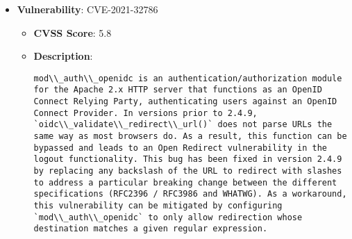 \documentclass{article}
\begin{document}
\begin{itemize}
        \item \textbf{Vulnerability}: CVE-2021-32786
        \begin{itemize}
            \item \textbf{CVSS Score}:  5.8 
            \item \textbf{Description}:
            \parbox[t]{0.9\linewidth}{
                \verb|mod\\_auth\\_openidc is an authentication/authorization module for the Apache 2.x HTTP server that functions as an OpenID Connect Relying Party, authenticating users against an OpenID Connect Provider. In versions prior to 2.4.9, `oidc\\_validate\\_redirect\\_url()` does not parse URLs the same way as most browsers do. As a result, this function can be bypassed and leads to an Open Redirect vulnerability in the logout functionality. This bug has been fixed in version 2.4.9 by replacing any backslash of the URL to redirect with slashes to address a particular breaking change between the different specifications (RFC2396 / RFC3986 and WHATWG). As a workaround, this vulnerability can be mitigated by configuring `mod\\_auth\\_openidc` to only allow redirection whose destination matches a given regular expression.|
            }
        \end{itemize}
    

\end{itemize}
\end{document}
